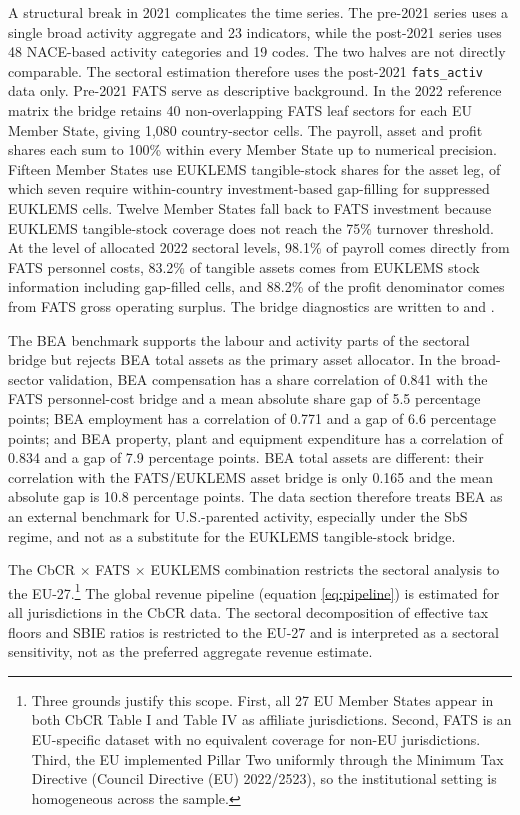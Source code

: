 \documentclass[11pt,a4paper]{article}
\newcommand{\code}[1]{\texttt{#1}}
\begin{document}
A structural break in 2021 complicates the time series. The pre-2021 series uses a single broad activity aggregate and 23 indicators, while the post-2021 series uses 48 NACE-based activity categories and 19 codes. The two halves are not directly comparable. The sectoral estimation therefore uses the post-2021 \code{fats\_activ} data only. Pre-2021 FATS serve as descriptive background. In the 2022 reference matrix the bridge retains 40 non-overlapping FATS leaf sectors for each EU Member State, giving 1{,}080 country-sector cells. The payroll, asset and profit shares each sum to 100\% within every Member State up to numerical precision. Fifteen Member States use EUKLEMS tangible-stock shares for the asset leg, of which seven require within-country investment-based gap-filling for suppressed EUKLEMS cells. Twelve Member States fall back to FATS investment because EUKLEMS tangible-stock coverage does not reach the 75\% turnover threshold. At the level of allocated 2022 sectoral levels, 98.1\% of payroll comes directly from FATS personnel costs, 83.2\% of tangible assets comes from EUKLEMS stock information including gap-filled cells, and 88.2\% of the profit denominator comes from FATS gross operating surplus. The bridge diagnostics are written to  and .

The BEA benchmark supports the labour and activity parts of the sectoral bridge but rejects BEA total assets as the primary asset allocator. In the broad-sector validation, BEA compensation has a share correlation of 0.841 with the FATS personnel-cost bridge and a mean absolute share gap of 5.5 percentage points; BEA employment has a correlation of 0.771 and a gap of 6.6 percentage points; and BEA property, plant and equipment expenditure has a correlation of 0.834 and a gap of 7.9 percentage points. BEA total assets are different: their correlation with the FATS/EUKLEMS asset bridge is only 0.165 and the mean absolute gap is 10.8 percentage points. The data section therefore treats BEA as an external benchmark for U.S.-parented activity, especially under the SbS regime, and not as a substitute for the EUKLEMS tangible-stock bridge.

The CbCR $\times$ FATS $\times$ EUKLEMS combination restricts the sectoral analysis to the EU-27.\footnote{Three grounds justify this scope. First, all 27 EU Member States appear in both CbCR Table I and Table IV as affiliate jurisdictions. Second, FATS is an EU-specific dataset with no equivalent coverage for non-EU jurisdictions. Third, the EU implemented Pillar Two uniformly through the Minimum Tax Directive (Council Directive (EU) 2022/2523), so the institutional setting is homogeneous across the sample.} The global revenue pipeline (equation \ref{eq:pipeline}) is estimated for all jurisdictions in the CbCR data. The sectoral decomposition of effective tax floors and SBIE ratios is restricted to the EU-27 and is interpreted as a sectoral sensitivity, not as the preferred aggregate revenue estimate.
\end{document}
